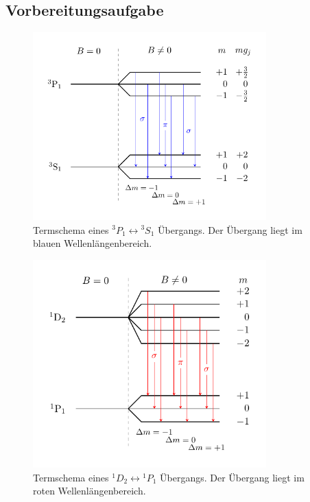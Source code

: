 \subsection{Vorbereitungsaufgabe}
\begin{figure}[h!]
  \centering
  \includegraphics[width=9cm]{termschema_blau.pdf}
  \caption{Termschema eines ${}^3P_1\leftrightarrow {}^3S_1$ Übergangs. Der Übergang liegt im blauen Wellenlängenbereich.}
  \label{fig:blau}
\end{figure}
\begin{figure}[h!]
  \centering
  \includegraphics[width=9cm]{termschema_rot.pdf}
  \caption{Termschema eines ${}^1D_2 \leftrightarrow {}^1P_1$ Übergangs. Der Übergang liegt im roten Wellenlängenbereich.}
  \label{fig:rot}
\end{figure}
\FloatBarrier

